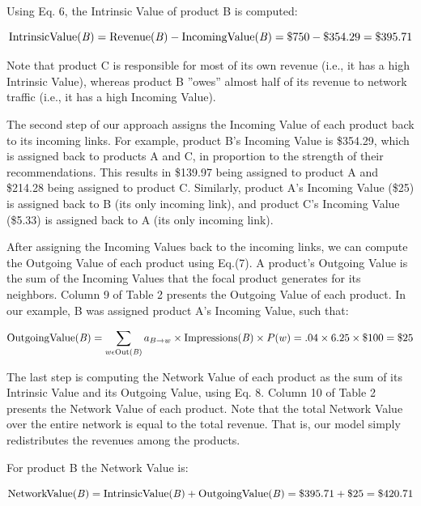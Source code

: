 Using Eq. 6, the Intrinsic Value of product B is computed:

\begin{equation}
\textrm{IntrinsicValue(\textit{B})} = \textrm{Revenue(\textit{B})} - \textrm{IncomingValue(\textit{B})} = \$750 - \$354.29 = \$395.71
\end{equation}

Note that product C is responsible for most of its own revenue (i.e., it has a high Intrinsic Value), whereas product B ”owes” almost half of its revenue to network traffic (i.e., it has a high Incoming Value).

The second step of our approach assigns the Incoming Value of each product back to its incoming links. For example, product B’s Incoming Value is \$354.29, which is assigned back to products A and C, in proportion to the strength of their recommendations. This results in \$139.97 being assigned to product A and \$214.28 being assigned to product C. Similarly, product A’s Incoming Value (\$25) is assigned back to B (its only incoming link), and product C’s Incoming Value (\$5.33) is assigned back to A (its only incoming link).

After assigning the Incoming Values back to the incoming links, we can compute the Outgoing Value of each product using Eq.(7). A product’s Outgoing Value is the sum of the Incoming Values that the focal product generates for its neighbors. Column 9 of Table 2 presents the Outgoing Value of each product. In our example, B was assigned product A’s Incoming Value, such that:

\begin{equation}
\textrm{OutgoingValue(\textit{B})} = \sum_{w \epsilon \textrm{Out(\textit{B})}} a_{B \rightarrow w} \times \textrm{Impressions(\textit{B})} \times P(w) = .04 \times 6.25 \times \$100 = \$25
\end{equation}

The last step is computing the Network Value of each product as the sum of its Intrinsic Value and its Outgoing Value, using Eq. 8. Column 10 of Table 2 presents the Network Value of each product. Note that the total Network Value over the entire network is equal to the total revenue. That is, our model simply redistributes the revenues among the products.

For product B the Network Value is:

\begin{equation}
\textrm{NetworkValue(\textit{B})} = \textrm{IntrinsicValue(\textit{B})} + \textrm{OutgoingValue(\textit{B})} = \$395.71 + \$25 = \$420.71
\end{equation}

